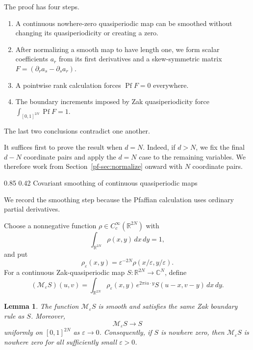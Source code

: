 \documentclass[11pt,reqno]{amsart}
\makeatletter
\numberwithin{equation}{section}
\renewcommand\subsection{\@startsection{subsection}{2}{\z@}%
  {0.85\baselineskip \@plus 0.25\baselineskip \@minus 0.10\baselineskip}%
  {0.42\baselineskip}%
  {\normalfont\bfseries}}
\newtheorem{lemma}[theorem]{Lemma}
\theoremstyle{definition}
\theoremstyle{remark}
\newcommand{\R}{\mathbb R}
\newcommand{\C}{\mathbb C}
\newcommand{\Pf}{\operatorname{Pf}}
\makeatother
\begin{document}
The proof has four steps.
\begin{enumerate}[label=(\arabic*)]
\item A continuous nowhere-zero quasiperiodic map can be smoothed without
      changing its quasiperiodicity or creating a zero.
\item After normalizing a smooth map to have length one, we form scalar
      coefficients $a_r$ from its first derivatives and a skew-symmetric
      matrix $F=(\partial_r a_s-\partial_s a_r)$.
\item A pointwise rank calculation forces $\Pf F=0$ everywhere.
\item The boundary increments imposed by Zak quasiperiodicity force
      $\int_{[0,1]^{2N}}\Pf F=1$.
\end{enumerate}
The last two conclusions contradict one another.

It suffices first to prove the result when $d=N$.  Indeed, if $d>N$,
we fix the final $d-N$ coordinate pairs and apply the $d=N$ case to the
remaining variables.  We therefore work from Section~\ref{pf-sec:normalize}
onward with $N$ coordinate pairs.

\subsection{Covariant smoothing of continuous quasiperiodic maps}

We record the smoothing step because the Pfaffian calculation uses ordinary
partial derivatives.

Choose a nonnegative function
$\rho\in C_c^\infty(\R^{2N})$ with
\[
 \int_{\R^{2N}}\rho(x,y)\,dx\,dy=1,
\]
and put
\[
 \rho_\varepsilon(x,y)=\varepsilon^{-2N}
 \rho(x/\varepsilon,y/\varepsilon).
\]
For a continuous Zak-quasiperiodic map
$S:\R^{2N}\to\C^N$, define
\begin{equation}\label{pf-eq:smoothing}
 (\mathcal M_\varepsilon S)(u,v)
 =\int_{\R^{2N}}
 \rho_\varepsilon(x,y)\,
 e^{2\pi i u\cdot y}
 S(u-x,v-y)\,dx\,dy.
\end{equation}

\begin{lemma}\label{pf-lem:smoothing}
The function $\mathcal M_\varepsilon S$ is smooth and satisfies the same
Zak boundary rule as $S$.  Moreover,
\[
 \mathcal M_\varepsilon S\longrightarrow S
\]
uniformly on $[0,1]^{2N}$ as $\varepsilon\to0$.  Consequently, if $S$ is
nowhere zero, then $\mathcal M_\varepsilon S$ is nowhere zero for all
sufficiently small $\varepsilon>0$.
\end{lemma}
\end{document}
